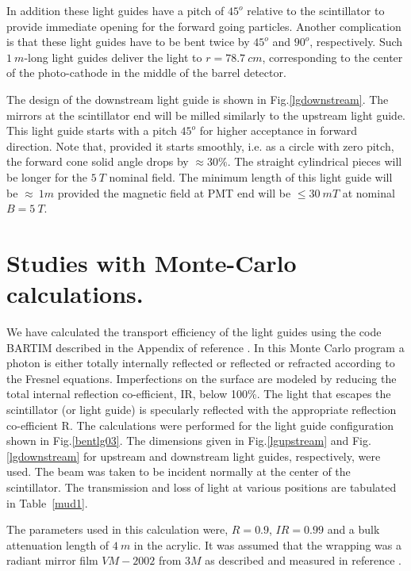 In addition these  light guides  
have a pitch of $45^o$ relative to the scintillator
to provide immediate  opening for the forward going particles.
Another complication is that these light guides
 have to be bent twice by $45^o$ and $90^o$, respectively.
Such  $1~m$-long light  guides deliver the light  to $r=78.7~cm$, 
corresponding to the center of the photo-cathode  in the middle of the barrel detector. 
 
The design of the downstream  light guide is shown in Fig.\ref{lgdownstream}. 
The mirrors at  the scintillator end  will be milled similarly to the upstream light guide.
 This light guide starts with  a pitch $45^o$
 for higher acceptance in forward direction.
 Note that, provided it starts smoothly, i.e. as a circle
 with zero pitch, the forward cone  solid angle drops by $\approx 30\%$.
The straight cylindrical pieces will be longer for the $5~T$ nominal field.
The minimum length of this light guide will be $\approx~1m$ provided the magnetic field 
at PMT end will be $\le30~mT$ at nominal $B=5~T$.  


\section{Studies with Monte-Carlo calculations.}
\label{mutchler}
We have calculated the transport efficiency of the light guides using the code BARTIM described in the Appendix of reference \cite{mutch}. 
In this Monte Carlo program a photon is either totally internally reflected or reflected or refracted according to the Fresnel equations. 
Imperfections on the surface are modeled by reducing the total internal reflection co-efficient, IR, below 100\%. 
The light that escapes the scintillator (or light guide) is specularly reflected with the appropriate reflection co-efficient R.
The calculations were performed for the light guide configuration shown in Fig.\ref{bentlg03}. 
The dimensions given in Fig.\ref{lgupstream} and Fig.\ref{lgdownstream} for  upstream and  downstream light guides, respectively,  were used. 
The beam was taken to be incident normally at the center of the scintillator.
The transmission and loss of light at various positions are tabulated in Table~\ref{mud1}.
 
The parameters used in this calculation were, $R=0.9$, $IR=0.99$ and a bulk attenuation length of $4~m$ in the acrylic. 
It was assumed that the wrapping was a radiant mirror film $VM-2002$ from $3M$ as described and measured in reference \cite{mutch}.

